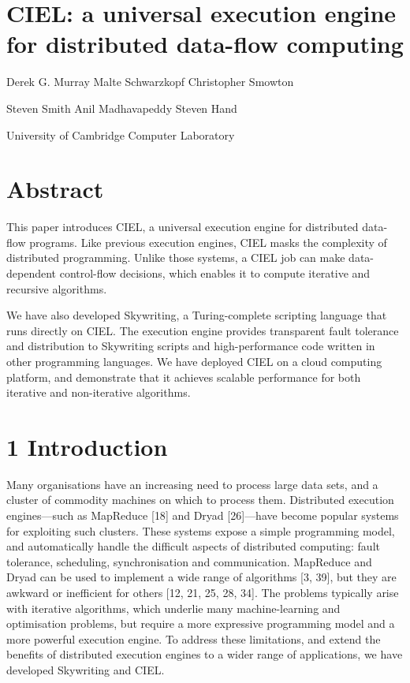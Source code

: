 \documentclass[
]{article}
\author{}
\date{}
\begin{document}
\section{CIEL: a universal execution engine for distributed data-flow
computing}\label{ciel-a-universal-execution-engine-for-distributed-data-flow-computing}

Derek G. Murray Malte Schwarzkopf Christopher Smowton

Steven Smith Anil Madhavapeddy Steven Hand

University of Cambridge Computer Laboratory

\section{Abstract}\label{abstract}

This paper introduces CIEL, a universal execution engine for distributed
data-flow programs. Like previous execution engines, CIEL masks the
complexity of distributed programming. Unlike those systems, a CIEL job
can make data-dependent control-flow decisions, which enables it to
compute iterative and recursive algorithms.

We have also developed Skywriting, a Turing-complete scripting language
that runs directly on CIEL. The execution engine provides transparent
fault tolerance and distribution to Skywriting scripts and
high-performance code written in other programming languages. We have
deployed CIEL on a cloud computing platform, and demonstrate that it
achieves scalable performance for both iterative and non-iterative
algorithms.

\section{1 Introduction}\label{introduction}

Many organisations have an increasing need to process large data sets,
and a cluster of commodity machines on which to process them.
Distributed execution engines---such as MapReduce {[}18{]} and Dryad
{[}26{]}---have become popular systems for exploiting such clusters.
These systems expose a simple programming model, and automatically
handle the difficult aspects of distributed computing: fault tolerance,
scheduling, synchronisation and communication. MapReduce and Dryad can
be used to implement a wide range of algorithms {[}3, 39{]}, but they
are awkward or inefficient for others {[}12, 21, 25, 28, 34{]}. The
problems typically arise with iterative algorithms, which underlie many
machine-learning and optimisation problems, but require a more
expressive programming model and a more powerful execution engine. To
address these limitations, and extend the benefits of distributed
execution engines to a wider range of applications, we have developed
Skywriting and CIEL.
\end{document}
